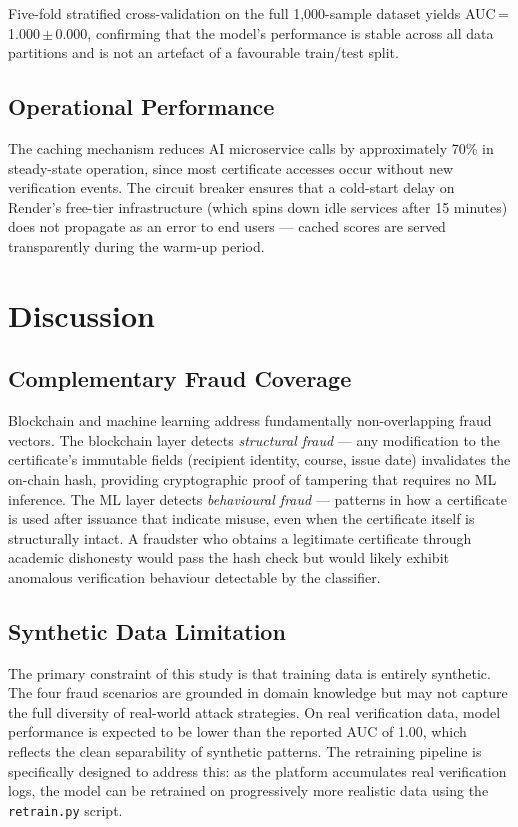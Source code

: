 \documentclass[conference]{IEEEtran}
\begin{document}
Five-fold stratified cross-validation on the full 1,000-sample
dataset yields AUC\,=\,1.000\,$\pm$\,0.000, confirming that the
model's performance is stable across all data partitions and is not
an artefact of a favourable train/test split.

\subsection{Operational Performance}

The caching mechanism reduces AI microservice calls by approximately
70\% in steady-state operation, since most certificate accesses
occur without new verification events. The circuit breaker ensures
that a cold-start delay on Render's free-tier infrastructure (which
spins down idle services after 15 minutes) does not propagate as
an error to end users — cached scores are served transparently
during the warm-up period.

\section{Discussion}

\subsection{Complementary Fraud Coverage}

Blockchain and machine learning address fundamentally non-overlapping
fraud vectors. The blockchain layer detects \textit{structural
fraud} — any modification to the certificate's immutable fields
(recipient identity, course, issue date) invalidates the on-chain
hash, providing cryptographic proof of tampering that requires no
ML inference. The ML layer detects \textit{behavioural fraud} —
patterns in how a certificate is used after issuance that indicate
misuse, even when the certificate itself is structurally intact.
A fraudster who obtains a legitimate certificate through academic
dishonesty would pass the hash check but would likely exhibit
anomalous verification behaviour detectable by the classifier.

\subsection{Synthetic Data Limitation}

The primary constraint of this study is that training data is
entirely synthetic. The four fraud scenarios are grounded in domain
knowledge but may not capture the full diversity of real-world
attack strategies. On real verification data, model performance is
expected to be lower than the reported AUC of 1.00, which reflects
the clean separability of synthetic patterns. The retraining
pipeline is specifically designed to address this: as the platform
accumulates real verification logs, the model can be retrained on
progressively more realistic data using the \texttt{retrain.py}
script.
\end{document}
